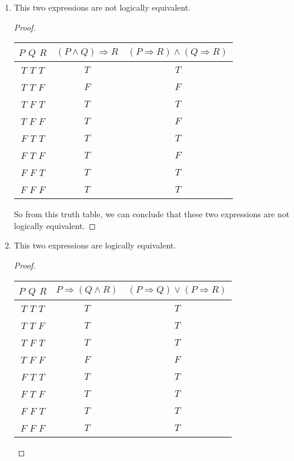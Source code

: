 \documentclass{article}
\begin{document}
\begin{enumerate}
\begin{enumerate}
\begin{proof}
                So from this truth table, we can conclude that these two expressions are not logically equivalent.
            \end{proof}
            \item 
            This two expressions are not logically equivalent.
            \begin{proof}
                \begin{tabular}{c|c|c} $P$ $Q$ $R$ & $(P \wedge Q) \Rightarrow R$ & $(P \Rightarrow R) \wedge (Q \Rightarrow R)$\\\hline
                    $T$ $T$ $T$ & $T$ & $T$\\
                    $T$ $T$ $F$ & $F$ & $F$\\
                    $T$ $F$ $T$ & $T$ & $T$\\
                    $T$ $F$ $F$ & $T$ & $F$\\
                    $F$ $T$ $T$ & $T$ & $T$\\
                    $F$ $T$ $F$ & $T$ & $F$\\
                    $F$ $F$ $T$ & $T$ & $T$\\
                    $F$ $F$ $F$ & $T$ & $T$\\
                \end{tabular}

                So from this truth table, we can conclude that these two expressions are not logically equivalent.
            \end{proof}
            \item 
            This two expressions are logically equivalent.
            \begin{proof}
                \begin{tabular}{c|c|c} $P$ $Q$ $R$ & $P \Rightarrow (Q \wedge R)$ & $(P \Rightarrow Q) \vee (P \Rightarrow R)$\\\hline
                    $T$ $T$ $T$ & $T$ & $T$\\
                    $T$ $T$ $F$ & $T$ & $T$\\
                    $T$ $F$ $T$ & $T$ & $T$\\
                    $T$ $F$ $F$ & $F$ & $F$\\
                    $F$ $T$ $T$ & $T$ & $T$\\
                    $F$ $T$ $F$ & $T$ & $T$\\
                    $F$ $F$ $T$ & $T$ & $T$\\
                    $F$ $F$ $F$ & $T$ & $T$\\
                \end{tabular}


\end{proof}
\end{enumerate}
\end{enumerate}
\end{document}
